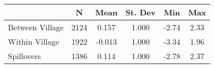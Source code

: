 \begin{tabular}{l*{5}{c}}\hline&\multicolumn{1}{c}{N}&\multicolumn{1}{c}{Mean}&\multicolumn{1}{c}{St. Dev}&\multicolumn{1}{c}{Min}&\multicolumn{1}{c}{Max}\\ \hline 
Between Village & 2124 & 0.157 & 1.000 & -2.74 & 2.33 \\
Within Village & 1922 & -0.013 & 1.000 & -3.34 & 1.96 \\
Spillovers & 1386 & 0.114 & 1.000 & -2.78 & 2.37 \\
\hline \end{tabular}
